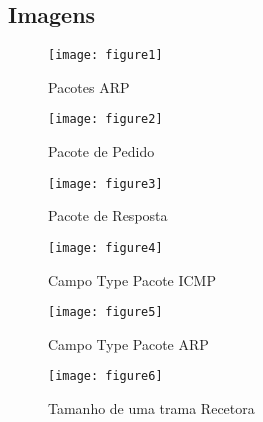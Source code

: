 \subsection*{Imagens}

\begin{figure}[ht]
	\texttt{[image: figure1]}                                                      
    \caption{Pacotes ARP}
    \label{fig:fig1}
\end{figure}

\begin{figure}[ht]
	\texttt{[image: figure2]}                                                      
    \caption{Pacote de Pedido}
    \label{fig:fig2}
\end{figure}

\begin{figure}[ht]
	\texttt{[image: figure3]}                                                      
    \caption{Pacote de Resposta}
    \label{fig:fig3}
\end{figure}

\begin{figure}[ht]
	\texttt{[image: figure4]}                                                      
    \caption{Campo Type Pacote ICMP}
    \label{fig:fig4}
\end{figure}

\begin{figure}[ht]
	\texttt{[image: figure5]}                                                      
    \caption{Campo Type Pacote ARP}
    \label{fig:fig5}
\end{figure}

\begin{figure}[ht]
	\texttt{[image: figure6]}                                                      
    \caption{Tamanho de uma trama Recetora}
    \label{fig:fig6}
\end{figure}


